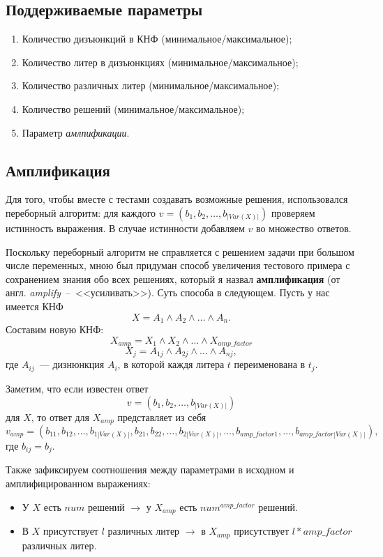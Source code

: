 \documentclass[12pt]{article}
\begin{document}
    \subsection{Поддерживаемые параметры}
    \begin{enumerate}
        \item Количество дизъюнкций в КНФ (минимальное/максимальное);
        \item Количество литер в дизъюнкциях (минимальное/максимальное);
        \item Количество различных литер (минимальное/максимальное);
        \item Количество решений (минимальное/максимальное);
        \item Параметр \textit{амлпификации}.
    \end{enumerate}

    \subsection{Амплификация}
    Для того, чтобы вместе с тестами создавать возможные решения, использовался переборный алгоритм: для каждого $v = (b_1, b_2, \ldots, b_{|Var(X)|})$ проверяем истинность выражения. В случае
    истинности добавляем $v$ во множество ответов.

    Поскольку переборный алгоритм не справляется с решением задачи при большом числе переменных, мною был придуман способ увеличения тестового примера с сохранением знания обо всех 
    решениях, который я назвал \textbf{амплификация} (от англ. \textit{amplify}~--~<<усиливать>>). Суть способа в следующем. Пусть у нас имеется КНФ
    $$ X = A_1 \land A_2 \land \ldots \land A_n .$$
    Составим новую КНФ:
    $$ X_{amp} = X_1 \land X_2 \land \ldots \land X_{amp\_factor}$$
    $$ X_j = A_{1j} \land A_{2j} \land \ldots \land A_{nj}, $$
    где $A_{ij}$~--- дизнюнкция $A_i$, в которой каждя литера $t$ переименована в $t_{j}$.

    Заметим, что если известен ответ $$v = (b_1, b_2, \ldots, b_{|Var(X)|})$$ для $X$, то ответ для $X_{amp}$ представляет из себя $$v_{amp} = (b_{11}, b_{12}, \ldots, b_{1|Var(X)|},
    b_{21}, b_{22}, \ldots, b_{2|Var(X)|}, \ldots, b_{amp\_factor1}, \ldots, b_{amp\_factor|Var(X)|}),$$ где $b_{ij} = b_j$.

    Также зафиксируем соотношения между параметрами в исходном и амплифицированном выражениях:
    \begin{itemize}
        \item У $X$ есть $num$ решений $\rightarrow$ у $X_{amp}$ есть $num^{amp\_factor}$ решений.
        \item В $X$ присутствует $l$ различных литер $\rightarrow$ в $X_{amp}$ присутствует $l * amp\_factor$ различных литер.
    \end{itemize}
\end{document}
